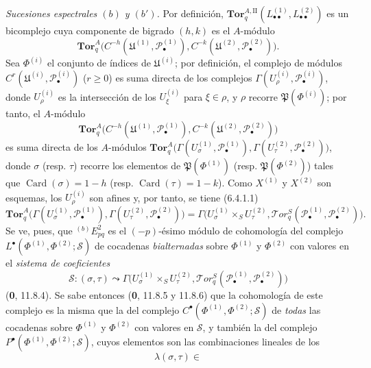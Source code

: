 \begin{env}[6.6.4]
\label{III.6.6.4}
\emph{Sucesiones espectrales $(b)$ y $(b')$.} Por definición,
$\mathbf{Tor}_q^{A,\mathrm{II}}
(L_{\bullet\bullet}^{(1)},L_{\bullet\bullet}^{(2)})$ es un bicomplejo cuya
componente de bigrado $(h,k)$ es el $A$-módulo
\[
  \mathbf{Tor}_q^A
  \bigl(C^{-h}(\mathfrak U^{(1)},\mathscr P_\bullet^{(1)}),
        C^{-k}(\mathfrak U^{(2)},\mathscr P_\bullet^{(2)})\bigr).
\]
Sea $\Phi^{(i)}$ el conjunto de índices de $\mathfrak U^{(i)}$; por
definición, el complejo de módulos
$C^r(\mathfrak U^{(i)},\mathscr P_\bullet^{(i)})$ ($r\geqslant0$) es suma
directa de los complejos
$\Gamma(U_\rho^{(i)},\mathscr P_\bullet^{(i)})$, donde $U_\rho^{(i)}$ es la
intersección de los $U_\xi^{(i)}$ para $\xi\in\rho$, y $\rho$ recorre
$\mathfrak P(\Phi^{(i)})$; por tanto, el $A$-módulo
\[
  \mathbf{Tor}_q^A
  \bigl(C^{-h}(\mathfrak U^{(1)},\mathscr P_\bullet^{(1)}),
        C^{-k}(\mathfrak U^{(2)},\mathscr P_\bullet^{(2)})\bigr)
\]
es suma directa de los $A$-módulos
$\mathbf{Tor}_q^A
\bigl(\Gamma(U_\sigma^{(1)},\mathscr P_\bullet^{(1)}),
\Gamma(U_\tau^{(2)},\mathscr P_\bullet^{(2)})\bigr)$,
donde $\sigma$ (resp. $\tau$) recorre los elementos de
$\mathfrak P(\Phi^{(1)})$ (resp. $\mathfrak P(\Phi^{(2)})$) tales
que $\operatorname{Card}(\sigma)=1-h$ (resp.
$\operatorname{Card}(\tau)=1-k$). Como $X^{(1)}$ y $X^{(2)}$ son
esquemas, los $U_\rho^{(i)}$ son afines y, por tanto, se tiene (6.4.1.1)
\[
  \mathbf{Tor}_q^A
  \bigl(\Gamma(U_\sigma^{(1)},\mathscr P_\bullet^{(1)}),
        \Gamma(U_\tau^{(2)},\mathscr P_\bullet^{(2)})\bigr)
  =\Gamma\bigl(U_\sigma^{(1)}\times_S U_\tau^{(2)},
    \mathscr{T}\!or_q^S
    (\mathscr P_\bullet^{(1)},\mathscr P_\bullet^{(2)})\bigr).
\]
Se ve, pues, que ${}^{(b)}E_{pq}^2$ es el $(-p)$-ésimo módulo de
cohomología del complejo
$L^\bullet(\Phi^{(1)},\Phi^{(2)};\mathscr S)$
de cocadenas \emph{bialternadas} sobre $\Phi^{(1)}$ y $\Phi^{(2)}$ con valores en el
\emph{sistema de coeficientes}
\[
  \mathscr S:(\sigma,\tau)\leadsto
  \Gamma\bigl(U_\sigma^{(1)}\times_S U_\tau^{(2)},
    \mathscr{T}\!or_q^S
    (\mathscr P_\bullet^{(1)},\mathscr P_\bullet^{(2)})\bigr)
\]
(\textbf{0}, 11.8.4). Se sabe entonces (\textbf{0}, 11.8.5 y
11.8.6) que la cohomología de este complejo es la misma que la del complejo
$C^\bullet(\Phi^{(1)},\Phi^{(2)};\mathscr S)$ de \emph{todas} las cocadenas sobre
$\Phi^{(1)}$ y $\Phi^{(2)}$ con valores en $\mathscr S$, y también la del
complejo $P^\bullet(\Phi^{(1)},\Phi^{(2)};\mathscr S)$, cuyos elementos son
las combinaciones lineales de los
\[
  \lambda(\sigma,\tau)\in
\]
\end{env}
